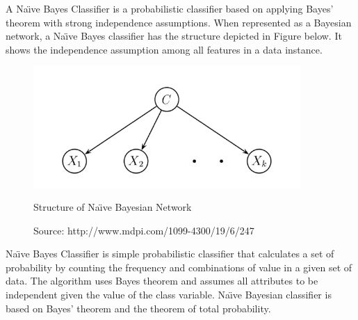 \par
A Na\"{\i}ve Bayes Classifier is a probabilistic classifier based on applying Bayes’ theorem with strong independence  assumptions. When represented as a Bayesian network, a Na\"{\i}ve Bayes classifier has the structure depicted in Figure below.  \cite{friedman1997bayesian} It shows the independence assumption among all features in a data instance.
\begin{figure}[bh] %
\begin{small}

	\includegraphics[width=4in]{images/naivebayesian.jpg}
	\caption{Structure of Na\"{\i}ve Bayesian Network} %
	\caption*{Source:   http://www.mdpi.com/1099-4300/19/6/247}
	\label{NB} %
\end{small}
\end{figure}

\par
Na\"{\i}ve Bayes Classifier is simple probabilistic classifier that calculates a set of probability by counting the frequency and combinations of value in a given set of data. The algorithm uses Bayes theorem and assumes all attributes to be independent given the value  of  the  class  variable. Na\"{\i}ve Bayesian classifier is based on Bayes’ theorem and the theorem of total probability. 


